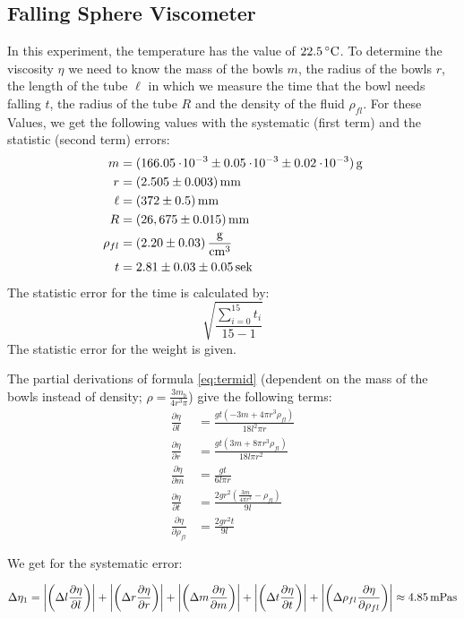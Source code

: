 \subsection{Falling Sphere Viscometer} \label{sec:aufgabe2}
In this experiment, the temperature has the value of $22.5\C$. To determine the viscosity $\eta$ we need to know the mass of the bowls $m$, the radius of the bowls $r$, the length of the tube $\ell$ in which we measure the time that the bowl needs falling $t$, the radius of the tube $R$ and the density of the fluid $\rho_{fl}$. For these Values, we get the following values with the systematic (first term) and the statistic (second term) errors:
\begin{align*}
m &= \unit[(166.05\e{-3} \pm 0.05\e{-3} \pm 0.02 \e{-3})]{g}\\
r &= \unit[(2.505 \pm 0.003)]{mm}\\
\ell &= \unit[(372 \pm 0.5)]{mm}\\
R &= \unit[(26,675 \pm 0.015)]{mm}\\
\rho_{fl} &= \unit[(2.20 \pm 0.03)]{\frac{g}{cm^3}}\\
t &= \unit[2.81 \pm 0.03 \pm 0.05]{sek}
\end{align*}
The statistic error for the time is calculated by:
\begin{equation*}
\sqrt{\frac{\sum_{i = 0}^{15}t_i}{15-1}}
\end{equation*}
The statistic error for the weight is given.



The partial derivations of formula \ref{eq:termid} (dependent on the mass of the bowls instead of density; $\rho = \frac{3m_b}{4r^3\pi}$) give the following terms:
\begin{align*}
\frac{\partial \eta}{\partial l}  &= \frac{g t \left(-3 m+4 \pi  r^3 \rho_{fl}\right)}{18 l^2 \pi  r}\\
\frac{\partial \eta}{\partial r} &= \frac{g t \left(3 m+8 \pi  r^3 \rho_{fl}\right)}{18 l \pi  r^2}\\
\frac{\partial \eta}{\partial m} &= \frac{g t}{6 l \pi  r}\\
\frac{\partial \eta}{\partial t} &= \frac{2 g r^2 \left(\frac{3 m}{4 \pi  r^3}- \rho_{fl}\right)}{9 l}\\
\frac{\partial \eta}{\partial \rho_{fl}} &= \frac{2 g r^2 t}{9 l}
\end{align*}

We get for the systematic error:

\begin{equation}
\Delta\eta_1 = 
\abs{\left(\Delta l\frac{\partial \eta}{\partial l}\right)}
+
\abs{\left(\Delta r\frac{\partial \eta}{\partial r}\right)}
+
\abs{\left(\Delta m\frac{\partial \eta}{\partial m}\right)}
+
\abs{\left(\Delta t\frac{\partial \eta}{\partial t}\right)}
+
\abs{\left(\Delta \rho_{fl}\frac{\partial \eta}{\partial \rho_{fl}}\right)}
\approx \unit[4.85]{mPa s}
\end{equation}

